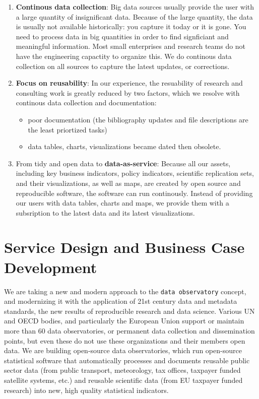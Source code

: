 \documentclass[
  a4paper,
  openany, a4paper, oneside]{book}
\providecommand{\tightlist}{%
  \setlength{\itemsep}{0pt}\setlength{\parskip}{0pt}}
\begin{document}
\begin{enumerate}
\def\labelenumi{\arabic{enumi}.}
\item
  \textbf{Continous data collection}: Big data sources usually provide the user with a large quantity of insignificant data. Because of the large quantity, the data is usually not available historically: you capture it today or it is gone. You need to process data in big quantities in order to find signficiant and meaningful information. Most small enterprises and research teams do not have the engineering capactity to organize this. We do continous data collection on all sources to capture the latest updates, or corrections.
\item
  \textbf{Focus on reusability}: In our experience, the resuability of research and consulting work is greatly reduced by two factors, which we resolve with continous data collection and documentation:

  \begin{itemize}
  \tightlist
  \item
    poor documentation (the bibliography updates and file descriptions are the least priortized tasks)
  \item
    data tables, charts, visualizations became dated then obsolete.
  \end{itemize}
\item
  From tidy and open data to \textbf{data-as-service}: Because all our assets, including key business indicators, policy indicators, scientific replication sets, and their visualizations, as well as maps, are created by open source and reproducible software, the software can run continously. Instead of providing our users with data tables, charts and maps, we provide them with a subsription to the latest data and its latest visualizations.
\end{enumerate}

\hypertarget{service}{%
\chapter{Service Design and Business Case Development}\label{service}}

We are taking a new and modern approach to the \texttt{data\ observatory} concept, and modernizing it with the application of 21st century data and metadata standards, the new results of reproducible research and data science. Various UN and OECD bodies, and particularly the European Union support or maintain more than 60 data observatories, or permanent data collection and dissemination points, but even these do not use these organizations and their members open data. We are building open-source data observatories, which run open-source statistical software that automatically processes and documents reusable public sector data (from public transport, meteorology, tax offices, taxpayer funded satellite systems, etc.) and reusable scientific data (from EU taxpayer funded research) into new, high quality statistical indicators.
\end{document}
